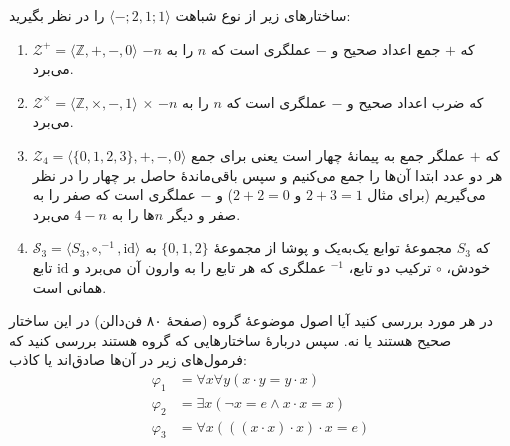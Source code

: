 
	ساختارهای زیر از نوع شباهت
	$\langle\mathord{-};2,1;1\rangle$
	را در نظر بگیرید:
	\begin{enumerate}[label=(\alph*)]
		\item $\mathcal{Z^+}=\langle\mathbb{Z},+,-,0\rangle$
		که
		$+$ جمع اعداد صحیح و
		$-$ عملگری است که $n$ را به $-n$ می‌برد.
		\item $\mathcal{Z^\times}=\langle\mathbb{Z},\times,-, 1\rangle$
		$\times$ که ضرب اعداد صحیح و
		$-$ عملگری است که $n$ را به $-n$ می‌برد.
		\item $\mathcal{Z}_4=\langle\{0,1,2,3\},+,-, 0\rangle$
		که $+$ عملگر جمع به پیمانهٔ چهار است یعنی برای جمع هر دو عدد ابتدا آن‌ها را جمع می‌کنیم و سپس باقی‌ماندهٔ حاصل بر چهار را در نظر می‌گیریم
		(برای مثال
		$2+3=1$
		و
		$2+2=0$)
		و
		$-$
		عملگری است که صفر را به صفر و دیگر $n$ها را به $4-n$ می‌برد.
		\item $\mathcal{S}_3=\langle S_3, \circ,^{-1},\text{id}\rangle$
		که
		$S_3$
		مجموعهٔ توابع یک‌به‌یک و پوشا از مجموعهٔ
		$\{0,1,2\}$
		به خودش،
		$\circ$
		ترکیب دو تابع،
		$^{-1}$
		عملگری که هر تابع را به وارون آن می‌برد و
		$\text{id}$
		تابع همانی است.
	\end{enumerate}
	در هر مورد بررسی کنید آیا اصول موضوعهٔ گروه
	(صفحهٔ ۸۰ فن‌دالن)
	در این ساختار صحیح هستند یا نه. سپس دربارهٔ ساختارهایی که گروه هستند بررسی کنید که فرمول‌های زیر در آن‌ها صادق‌اند یا کاذب:
	\begin{align*}
		\varphi_1 &= \forall x\forall y (x\cdot y = y\cdot x) \\
		\varphi_2 &= \exists x (\neg x = e \wedge x\cdot x = x) \\
		\varphi_3 &= \forall x (((x\cdot x)\cdot x)\cdot x = e)
	\end{align*}
	
